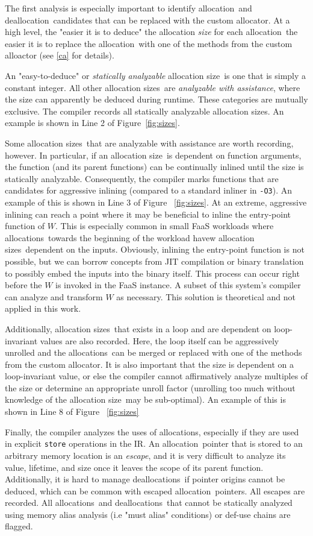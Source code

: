 \documentclass{article}
\def\ALL{allocation}
\def\DALL{deallocation}
\def\ALLS{allocations}
\def\DALLS{deallocations}
\def\SIZE{allocation size}
\def\SIZES{allocation sizes}
\begin{document}
The first analysis is especially important to identify \ALL\ and \DALL\ candidates that
can be replaced with the custom allocator. At a high level, the "easier it is to deduce"
the allocation \textit{size} for each \ALL\, the easier it is to replace the \ALL\ with one
of the methods from the custom alloactor (see \ref{ca} for details).

An "easy-to-deduce" or \textit{statically analyzable} \SIZE\ is one that is 
simply a constant integer. All other \SIZES\ are \textit{analyzable with
assistance}, where the size can apparently be deduced during runtime. These 
categories are mutually exclusive. The compiler records all statically analyzable 
\SIZES . An example is shown in Line 2 of Figure~\ref{fig:sizes}.

Some \SIZES\ that are analyzable with assistance are worth recording, however. In
particular, if an \SIZE\ is dependent on function arguments, the function (and
its parent functions) can be continually inlined until the size is statically
analyzable. Consequently, the compiler marks functions that are candidates for
aggressive inlining (compared to a standard inliner in \texttt{-O3}). An example of
this is shown in Line 3 of Figure ~\ref{fig:sizes}. At an
extreme, aggressive inlining can reach a point where it may be beneficial to
inline the entry-point function of $W$. This is especially common in small 
FaaS workloads where \ALLS\ towards the beginning of the workload havew \SIZES\
dependent on the inputs. Obviously, inlining the entry-point function is not 
possible, but we can borrow concepts from JIT compilation or binary translation
to possibly embed the inputs into the binary itself. This process can occur
right before the $W$ is invoked in the FaaS instance. A subset of this system's compiler
can analyze and transform $W$ as necessary. This solution is theoretical and 
not applied in this work.

Additionally, \SIZES\ that exists in a loop and are dependent on loop-invariant
values are also recorded. Here, the loop itself can be aggressively unrolled and
the \ALLS\ can be merged or replaced with one of the methods from the custom 
allocator. It is also important that the size is dependent on a loop-invariant 
value, or else the compiler cannot affirmatively analyze multiples of the size or
determine an appropriate unroll factor (unrolling too much without knowledge of
the \SIZE\ may be sub-optimal). An example of this is shown in Line 8 of Figure ~\ref{fig:sizes}

Finally, the compiler analyzes the uses of \ALLS , especially if they are used
in explicit \texttt{store} operations in the IR. An \ALL\ pointer that is stored
to an arbitrary memory location is an \textit{escape}, and it is very difficult
to analyze its value, lifetime, and size once it leaves the scope of its parent
function. Additionally, it is hard to manage \DALLS\ if pointer origins
cannot be deduced, which can be common with escaped \ALL\ pointers. All escapes
are recorded. All \ALLS\ and \DALLS\ that cannot be statically analyzed using
memory alias analysis (i.e "must alias" conditions) or def-use chains are flagged.
\end{document}
